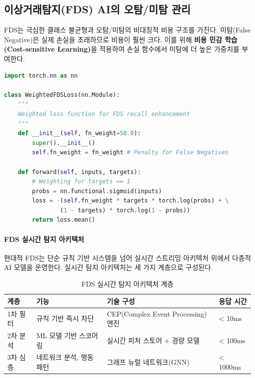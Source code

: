 \subsection{이상거래탐지(FDS) AI의 오탐/미탐 관리}
\label{sec:17.2.3}

FDS는 극심한 클래스 불균형과 오탐/미탐의 비대칭적 비용 구조를 가진다. 미탐(False Negative)은 실제 손실을 초래하므로 비용이 훨씬 크다. 이를 위해 \textbf{비용 민감 학습(Cost-sensitive Learning)}을 적용하여 손실 함수에서 미탐에 더 높은 가중치를 부여한다.

\begin{lstlisting}[language=Python, caption={Cost-sensitive Learning for FDS Recall}, label={lst:cost_sensitive}]
import torch.nn as nn

class WeightedFDSLoss(nn.Module):
    """
    Weighted loss function for FDS recall enhancement
    """
    def __init__(self, fn_weight=50.0):
        super().__init__()
        self.fn_weight = fn_weight # Penalty for False Negatives

    def forward(self, inputs, targets):
        # Weighting for targets == 1
        probs = nn.functional.sigmoid(inputs)
        loss = -(self.fn_weight * targets * torch.log(probs) + \
                (1 - targets) * torch.log(1 - probs))
        return loss.mean()
\end{lstlisting}

\paragraph{FDS 실시간 탐지 아키텍처}

현대적 FDS는 단순 규칙 기반 시스템을 넘어 실시간 스트리밍 아키텍처 위에서 다층적 AI 모델을 운영한다. 실시간 탐지 아키텍처는 세 가지 계층으로 구성된다.

\begin{table}[htbp]
\centering
\caption{FDS 실시간 탐지 아키텍처 계층}
\label{tab:17_fds_arch}
\begin{tabularx}{\textwidth}{p{2.5cm}p{3cm}Xp{2.5cm}}
\toprule
\textbf{계층} & \textbf{기능} & \textbf{기술 구성} & \textbf{응답 시간} \\
\midrule
1차 필터 & 규칙 기반 즉시 차단 & CEP(Complex Event Processing) 엔진 & < 10ms \\
2차 분석 & ML 모델 기반 스코어링 & 실시간 피처 스토어 + 경량 모델 & < 100ms \\
3차 심층 & 네트워크 분석, 행동 패턴 & 그래프 뉴럴 네트워크(GNN) & < 1000ms \\
\bottomrule
\end{tabularx}
\end{table}


